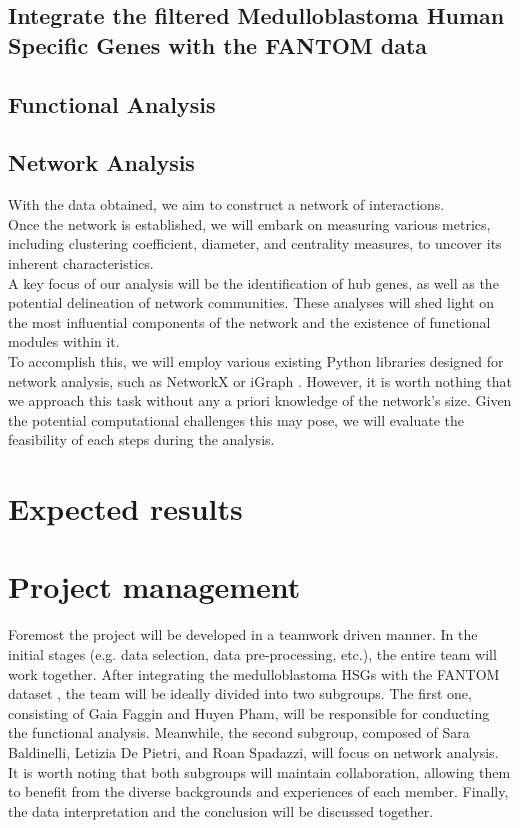 \documentclass[10pt]{SelfArx} %
\begin{document}
\subsection{Integrate the filtered Medulloblastoma Human Specific Genes with the FANTOM data}


\subsection{Functional Analysis}\label{sec:functional_analysis}


\subsection{Network Analysis}\label{sec:network_analysis}
With the data obtained, we aim to construct a network of interactions. \\
Once the network is established, we will embark on measuring various metrics, including clustering coefficient, diameter, and centrality measures, to uncover its inherent characteristics. \\
A key focus of our analysis will be the identification of hub genes, as well as the potential delineation of network communities. These analyses will shed light on the most influential components of the network and the existence of functional modules within it. \\
To accomplish this, we will employ various existing Python libraries designed for network analysis, such as NetworkX \cite{hagberg2008exploring} or iGraph \cite{csardi2006igraph}. However, it is worth nothing that we approach this task without any a priori knowledge of the network's size. Given the potential computational challenges this may pose, we will evaluate the feasibility of each steps during the analysis. 


\section{Expected results}\label{sec:expected_results}

\section{Project management}\label{sec:management}
Foremost the project will be developed in a teamwork driven manner. In the initial stages (e.g. data selection, data pre-processing, etc.), the entire team will work together. After integrating the medulloblastoma HSGs with the FANTOM dataset \cite{fantom5}, the team will be ideally divided into two subgroups. The first one, consisting of Gaia Faggin and Huyen Pham, will be responsible for conducting the functional analysis. Meanwhile, the second subgroup, composed of Sara Baldinelli, Letizia De Pietri, and Roan Spadazzi, will focus on network analysis. It is worth noting that both subgroups will maintain collaboration, allowing them to benefit from the diverse backgrounds and experiences of each member. Finally, the data interpretation and the conclusion will be discussed together.





\end{document}
